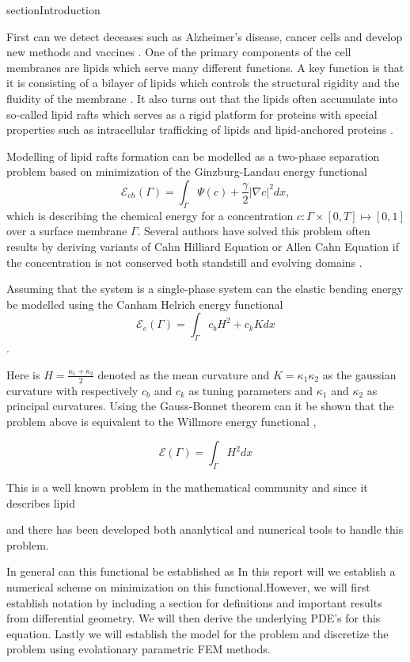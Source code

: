 section{Introduction}\label{sec:introduction}



First can we detect deceases such as Alzheimer's disease, cancer cells and develop new methods and vaccines \cite{small2006sorting}. One of the primary components of the cell membranes are lipids which serve many different functions. A key function is that it is consisting of a bilayer of lipids which controls the structural rigidity and the fluidity of the membrane \cite{ neidleman87}. It also turns out that the lipids often accumulate into so-called lipid rafts which serves as a rigid platform for proteins with special properties such as intracellular trafficking of lipids and lipid-anchored proteins \cite{Edidin03}.

Modelling of lipid rafts formation can be modelled as a two-phase separation problem based on minimization of the Ginzburg-Landau energy functional \cite{yushutin19}
\[
\mathcal{E}_{ch}  \left( \Gamma  \right) = \int_{\Gamma  }^{}\Psi \left( c \right) + \frac{\gamma}{2} \left\lvert \nabla c \right\rvert^{2} dx,
\]
which is describing the chemical energy for a concentration $c: \Gamma \times \left[ 0,T \right] \mapsto  \left[ 0,1 \right]  $ over a surface membrane $\Gamma$. Several authors have solved this problem often results by deriving variants of Cahn
Hilliard Equation or Allen Cahn Equation if the concentration is not conserved both standstill and evolving domains \cite{yushutin19, ratz16,Gera2017, caetano21,yushutin19} .

Assuming that the system is a single-phase system can the elastic bending energy be modelled using the Canham Helrich energy functional \cite{wang08} \[
\mathcal{E} _{e}\left( \Gamma  \right) =   \int_{\Gamma }^{}  c_{b} H^{2} + c_{k} K  dx
\].

Here is $H = \frac{ \kappa_1 + \kappa_2 }{2}$ denoted as the mean curvature and $K = \kappa_1 \kappa_2$ as the gaussian curvature with respectively $c_{b}$ and $c_{k}$ as tuning parameters and $\kappa_1$ and $\kappa_2$ as principal curvatures. Using the Gauss-Bonnet theorem can it be shown that the problem above is equivalent to the Willmore energy
functional \cite[Ch 8.5 Thm 8.29]{montiel2009curves},

\[
\mathcal{E} \left( \Gamma  \right) = \int_{\Gamma }^{}  H ^2 dx
\]

This is a well known problem in the mathematical community and since it describes lipid

and there has been developed both ananlytical and numerical tools to handle this problem.

In general can this functional be established as
In this report will we establish a numerical scheme on minimization on this functional.However, we will first establish notation by including a section for definitions and important results from differential geometry. We will then derive  the
underlying PDE's for this equation. Lastly we will establish the model for the problem and discretize the problem using evolationary parametric FEM methods.



